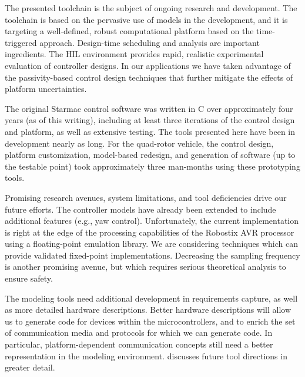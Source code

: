 The presented toolchain is the subject of ongoing research and development. The toolchain is based on the pervasive use of models in the development, and it is targeting a well-defined, robust computational platform based on the time-triggered approach. Design-time scheduling and analysis are important ingredients. The HIL environment provides rapid, realistic experimental evaluation of controller designs. In our applications we have taken advantage of the passivity-based control design techniques that further mitigate the effects of platform uncertainties.  

The original Starmac control software was written in C over approximately four years (as of this writing), including at least three iterations of the control design and platform, as well as extensive testing.  The tools presented here have been in development nearly as long. For the quad-rotor vehicle, the control design, platform customization, model-based redesign, and generation of software (up to the testable point) took approximately three man-months using these prototyping tools.

Promising research avenues, system limitations, and tool deficiencies drive our future efforts.  The controller models have already been extended to include additional features (e.g., yaw control).  Unfortunately, the current implementation is right at the edge of the processing capabilities of the Robostix AVR processor using a floating-point emulation library.  We are considering techniques which can provide validated fixed-point implementations.  Decreasing the sampling frequency is another promising avenue, but which requires serious theoretical analysis to ensure safety.
   
The modeling tools need additional development in requirements capture, as well as more detailed hardware descriptions. Better hardware descriptions will allow us to generate code for devices within the microcontrollers, and to enrich the set of communication media and protocols for which we can generate code.   In particular, platform-dependent communication concepts still need a better representation in the modeling environment.  \cite{aces08} discusses future tool directions in greater detail. 